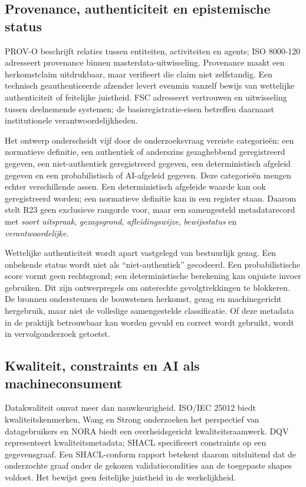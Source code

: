 \subsection{Provenance, authenticiteit en epistemische status}
PROV-O beschrijft relaties tussen entiteiten, activiteiten en agents; ISO 8000-120 adresseert provenance binnen masterdata-uitwisseling. \citep{S33,S04} Provenance maakt een herkomstclaim uitdrukbaar, maar verifieert die claim niet zelfstandig. Een technisch geauthenticeerde afzender levert evenmin vanzelf bewijs van wettelijke authenticiteit of feitelijke juistheid. FSC adresseert vertrouwen en uitwisseling tussen deelnemende systemen; de basisregistratie-eisen betreffen daarnaast institutionele verantwoordelijkheden. \citep{S21,S25}

Het ontwerp onderscheidt vijf door de onderzoeksvraag vereiste categorieën: een normatieve definitie, een authentiek of anderszins gezaghebbend geregistreerd gegeven, een niet-authentiek geregistreerd gegeven, een deterministisch afgeleid gegeven en een probabilistisch of AI-afgeleid gegeven. Deze categorieën mengen echter verschillende assen. Een deterministisch afgeleide waarde kan ook geregistreerd worden; een normatieve definitie kan in een register staan. Daarom stelt R23 geen exclusieve rangorde voor, maar een samengesteld metadatarecord met \emph{soort uitspraak}, \emph{gezagsgrond}, \emph{afleidingswijze}, \emph{bewijsstatus} en \emph{verantwoordelijke}.

Wettelijke authenticiteit wordt apart vastgelegd van bestuurlijk gezag. Een onbekende status wordt niet als ``niet-authentiek'' gecodeerd. Een probabilistische score vormt geen rechtsgrond; een deterministische berekening kan onjuiste invoer gebruiken. Dit zijn ontwerpregels om onterechte gevolgtrekkingen te blokkeren. De bronnen ondersteunen de bouwstenen herkomst, gezag en machinegericht hergebruik, maar niet de volledige samengestelde classificatie. \citep{S25,S33,L11,L16} Of deze metadata in de praktijk betrouwbaar kan worden gevuld en correct wordt gebruikt, wordt in vervolgonderzoek getoetst.

\subsection{Kwaliteit, constraints en AI als machineconsument}
Datakwaliteit omvat meer dan nauwkeurigheid. ISO/IEC 25012 biedt kwaliteitskenmerken, Wang en Strong onderzoeken het perspectief van datagebruikers en NORA biedt een overheidsgericht kwaliteitsraamwerk. \citep{S12,L15,S48} DQV representeert kwaliteitsmetadata; SHACL specificeert constraints op een gegevensgraaf. \citep{S34,S32} Een SHACL-conform rapport betekent daarom uitsluitend dat de onderzochte graaf onder de gekozen validatiecondities aan de toegepaste shapes voldoet. Het bewijst geen feitelijke juistheid in de werkelijkheid.

